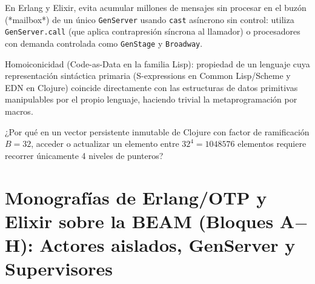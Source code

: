 \documentclass{book}
\begin{document}
\begin{tcolorbox}[title={Consejo}, studiumtip, breakable]

En Erlang y Elixir, evita acumular millones de mensajes sin procesar en el buzón (*mailbox*) de un único \texttt{GenServer} usando \texttt{cast} asíncrono sin control: utiliza \texttt{GenServer.call} (que aplica contrapresión síncrona al llamador) o procesadores con demanda controlada como \texttt{GenStage} y \texttt{Broadway}.
\end{tcolorbox}

\begin{tcolorbox}[title={Definición}, studiumdef, breakable]

Homoiconicidad (Code-as-Data en la familia Lisp): propiedad de un lenguaje cuya representación sintáctica primaria (S-expressions en Common Lisp/Scheme y EDN en Clojure) coincide directamente con las estructuras de datos primitivas manipulables por el propio lenguaje, haciendo trivial la metaprogramación por macros.
\end{tcolorbox}

\begin{tcolorbox}[title={Autoficha}, studiumcheck, breakable]

¿Por qué en un vector persistente inmutable de Clojure con factor de ramificación \(B = 32\), acceder o actualizar un elemento entre \(32^4 = 1048576\) elementos requiere recorrer únicamente 4 niveles de punteros?
\end{tcolorbox}

\section{Monografías de Erlang/OTP y Elixir sobre la BEAM (Bloques A\(-\)H): Actores aislados, GenServer y Supervisores}
\end{document}

